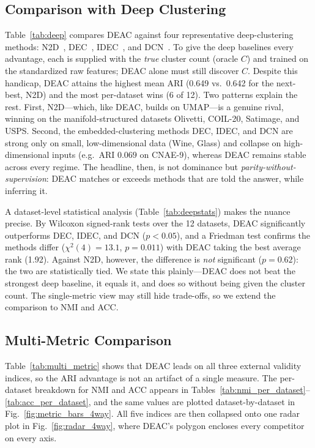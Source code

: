 \documentclass[conference]{IEEEtran}
\begin{document}
\subsection{Comparison with Deep Clustering}

Table~\ref{tab:deep} compares DEAC against four representative deep-clustering
methods: N2D~\cite{mcconville2021n2d}, DEC~\cite{xie2016unsupervised},
IDEC~\cite{guo2017improved}, and DCN~\cite{yang2017towards}. To give the
deep baselines every advantage, each is supplied with the \emph{true} cluster
count (oracle $C$) and trained on the standardized raw features; DEAC alone
must still discover $C$. Despite this handicap, DEAC attains the highest mean
ARI (0.649 vs.\ 0.642 for the next-best, N2D) and the most per-dataset wins
(6 of 12). Two patterns explain the rest. First, N2D---which, like DEAC, builds
on UMAP---is a genuine rival, winning on the manifold-structured datasets
Olivetti, COIL-20, Satimage, and USPS. Second, the embedded-clustering methods
DEC, IDEC, and DCN are strong only on small, low-dimensional data (Wine, Glass)
and collapse on high-dimensional inputs (e.g.\ ARI $0.069$ on CNAE-9), whereas
DEAC remains stable across every regime. The headline, then, is not dominance
but \emph{parity-without-supervision}: DEAC matches or exceeds methods that are
told the answer, while inferring it.



A dataset-level statistical analysis (Table~\ref{tab:deepstats}) makes the
nuance precise. By Wilcoxon signed-rank tests over the 12 datasets, DEAC
significantly outperforms DEC, IDEC, and DCN ($p<0.05$), and a Friedman test
confirms the methods differ ($\chi^2(4){=}13.1$, $p{=}0.011$) with DEAC taking
the best average rank (1.92). Against N2D, however, the difference is
\emph{not} significant ($p{=}0.62$): the two are statistically tied. We state
this plainly---DEAC does not beat the strongest deep baseline, it equals it,
and does so without being given the cluster count. The single-metric view may
still hide trade-offs, so we extend the comparison to NMI and ACC.



\subsection{Multi-Metric Comparison}

Table~\ref{tab:multi_metric} shows that DEAC leads on all three external validity indices, so the ARI advantage is not an artifact of a single measure. The per-dataset breakdown for NMI and ACC appears in Tables~\ref{tab:nmi_per_dataset}--\ref{tab:acc_per_dataset}, and the same values are plotted dataset-by-dataset in Fig.~\ref{fig:metric_bars_4way}. All five indices are then collapsed onto one radar plot in Fig.~\ref{fig:radar_4way}, where DEAC's polygon encloses every competitor on every axis.
\end{document}
